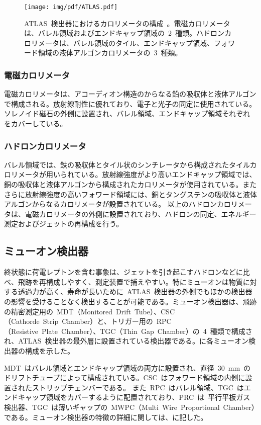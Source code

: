 \begin{figure}[H]
        \centering   
        \texttt{[image: img/pdf/ATLAS.pdf]}
        \caption[ATLAS~検出器におけるカロリメータの構成]{ATLAS~検出器におけるカロリメータの構成~\cite{TR:01}。電磁カロリメータは、バレル領域およびエンドキャップ領域の~2~種類。ハドロンカロリメータは、バレル領域のタイル、エンドキャップ領域、フォワード領域の液体アルゴンカロリメータの~3~種類。}\label{fig:calo}
\end{figure}

\subsubsection{電磁カロリメータ}
電磁カロリメータは、アコーディオン構造のからなる鉛の吸収体と液体アルゴンで構成される。放射線耐性に優れており、電子と光子の同定に使用されている。ソレノイド磁石の外側に設置され、バレル領域、エンドキャップ領域それぞれをカバーしている。

\subsubsection{ハドロンカロリメータ}
バレル領域では、鉄の吸収体とタイル状のシンチレータから構成されたタイルカロリメータが用いられている。放射線強度がより高いエンドキャップ領域では、銅の吸収体と液体アルゴンから構成されたカロリメータが使用されている。またさらに放射線強度の高いフォワード領域には、銅とタングステンの吸収体と液体アルゴンからなるカロリメータが設置されている。
以上のハドロンカロリメータは、電磁カロリメータの外側に設置されており、ハドロンの同定、エネルギー測定およびジェットの再構成を行う。


\subsection{ミューオン検出器}
終状態に荷電レプトンを含む事象は、ジェットを引き起こすハドロンなどに比べ、飛跡を再構成しやすく、測定装置で捕えやすい。特にミューオンは物質に対する透過力が高く、寿命が長いために~ATLAS~検出器の外側でもほかの検出器の影響を受けることなく検出することが可能である。ミューオン検出器は、飛跡の精密測定用の~MDT（Monitored~Drift~Tube）、CSC（Cathorde~Strip~Chamber）と、トリガー用の~RPC（Resistive~Plate~Chamber）、TGC（Thin~Gap~Chamber）の~4~種類で構成され、ATLAS~検出器の最外層に設置されている検出器である。に各ミューオン検出器の構成を示した。

MDT~はバレル領域とエンドキャップ領域の両方に設置され、直径~30~mm~のドリフトチューブによって構成されている。CSC~はフォワード領域の内側に設置されたストリップチェンバーである。 また~RPC~はバレル領域、TGC~はエンドキャップ領域をカバーするように配置されており、PRC~は~平行平板ガス検出器、TGC~は薄いギャップの~MWPC（Multi~Wire~Proportional~Chamber）である。ミューオン検出器の特徴の詳細に関しては、に記した。

